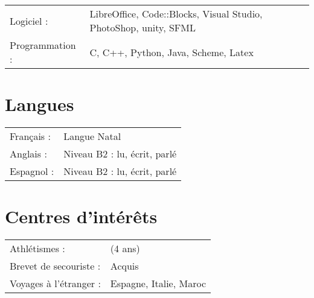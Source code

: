 \documentclass[a4papaer]{article}
\begin{document}
\begin{tabular}{ll}
Logiciel : & LibreOffice, Code::Blocks, Visual Studio, PhotoShop, unity, SFML\\
Programmation : & C, C++, Python, Java, Scheme, Latex\\
\end{tabular}

\section*{Langues}

\begin{tabular}{ll}
Français : & Langue Natal\\
Anglais : & Niveau B2 : lu, écrit, parlé\\
Espagnol : & Niveau B2 : lu, écrit, parlé\\
\end{tabular}

\section*{Centres d’intérêts}

\begin{tabular}{ll}
Athlétismes : & (4 ans)\\
Brevet de secouriste : & Acquis\\
Voyages à l’étranger : & Espagne, Italie, Maroc\\
\end{tabular}
\end{document}
